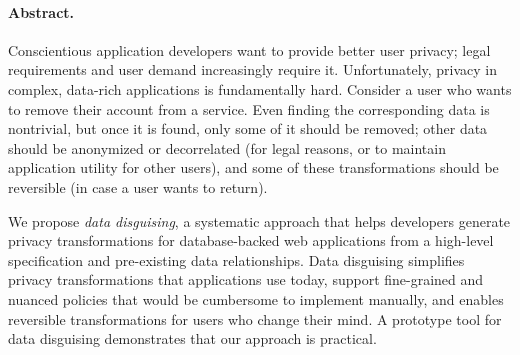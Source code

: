\paragraph{Abstract.}

Conscientious application developers want to provide better user privacy;
legal requirements and user demand increasingly require it.
%
Unfortunately, privacy in complex, data-rich applications is fundamentally
hard. Consider a user who wants to remove their account from a service. Even
finding the corresponding data is nontrivial, but once it is found, only some
of it should be removed; other data should be anonymized or decorrelated (for
legal reasons, or to maintain application utility for other users), and some
of these transformations should be reversible (in case a user wants to
return).
%
%
%

We propose \emph{data disguising}, a systematic approach that helps developers generate
privacy transformations for database-backed web applications from a high-level specification
and pre-existing data relationships.
%
Data disguising simplifies privacy transformations that applications use today, support
fine-grained and nuanced policies that would be cumbersome to implement manually, and
    enables  reversible transformations for users who change their mind.
%
%
A prototype tool for data disguising demonstrates that our approach is practical.

